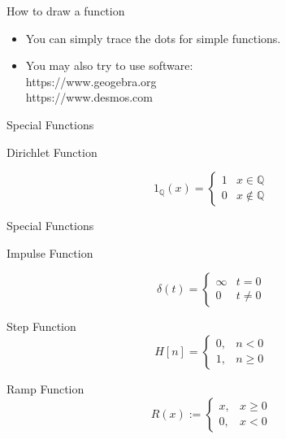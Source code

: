 \documentclass{beamer}
\begin{document}
\begin{frame}{How to draw a function}
    \begin{itemize}
        \item You can simply trace the dots for simple functions.
        \item You may also try to use software:\\
                https://www.geogebra.org\\
                https://www.desmos.com
    \end{itemize}
\end{frame}
\begin{frame}{Special Functions}
    \begin{block}{Dirichlet Function}
    
$$
1_{\mathbb{Q}}(x)= \begin{cases}1 & x \in \mathbb{Q} \\ 0 & x \notin \mathbb{Q}\end{cases}
$$
    \end{block}
\end{frame}

\begin{frame}{Special Functions}
    \begin{block}{Impulse Function}
    
$$
\delta(t)= \begin{cases}\infty & t=0 \\ 0 & t \neq 0\end{cases}
$$
    \end{block}
    \begin{block}{Step Function}
$$
H[n]= \begin{cases}0, & n<0 \\ 1, & n \geq 0\end{cases}
$$
    \end{block}
    \begin{block}{Ramp Function}
$$
R(x):= \begin{cases}x, & x \geq 0 \\ 0, & x<0\end{cases}
$$
    \end{block}
\end{frame}
\end{document}
